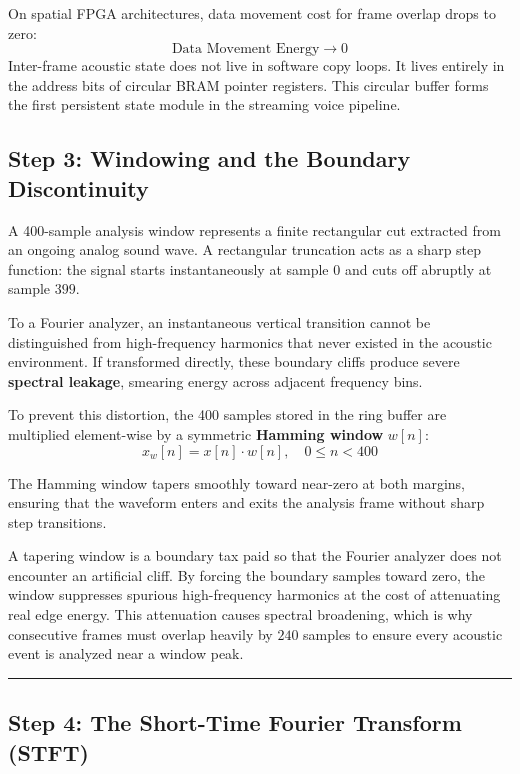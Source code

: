 \documentclass[11pt,a4paper]{article}
\begin{document}
\begin{groundbreaking}
On spatial FPGA architectures, data movement cost for frame overlap drops to zero:
$$\text{Data Movement Energy} \to 0$$
Inter-frame acoustic state does not live in software copy loops. It lives entirely in the address bits of circular BRAM pointer registers. This circular buffer forms the first persistent state module in the streaming voice pipeline.
\end{groundbreaking}

\clearpage

\subsection*{Step 3: Windowing and the Boundary Discontinuity}

A 400-sample analysis window represents a finite rectangular cut extracted from an ongoing analog sound wave. A rectangular truncation acts as a sharp step function: the signal starts instantaneously at sample $0$ and cuts off abruptly at sample $399$.

To a Fourier analyzer, an instantaneous vertical transition cannot be distinguished from high-frequency harmonics that never existed in the acoustic environment. If transformed directly, these boundary cliffs produce severe \textbf{spectral leakage}, smearing energy across adjacent frequency bins.

To prevent this distortion, the 400 samples stored in the ring buffer are multiplied element-wise by a symmetric \textbf{Hamming window} $w[n]$:
$$x_w[n] = x[n] \cdot w[n], \quad 0 \le n < 400$$

The Hamming window tapers smoothly toward near-zero at both margins, ensuring that the waveform enters and exits the analysis frame without sharp step transitions.

\begin{physicalinsight}
A tapering window is a boundary tax paid so that the Fourier analyzer does not encounter an artificial cliff. By forcing the boundary samples toward zero, the window suppresses spurious high-frequency harmonics at the cost of attenuating real edge energy. This attenuation causes spectral broadening, which is why consecutive frames must overlap heavily by $240$ samples to ensure every acoustic event is analyzed near a window peak.
\end{physicalinsight}

\smallskip
\hrule
\smallskip

\subsection*{Step 4: The Short-Time Fourier Transform (STFT)}
\end{document}
